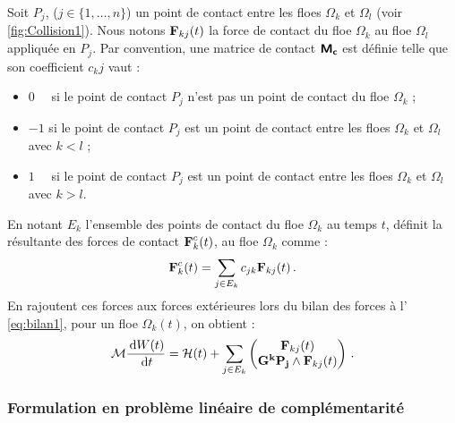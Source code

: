 Soit $P_j$, ($j \in \{1,\ldots,n\}$) un point de contact entre les floes $\Omega_k$ et $\Omega_l$ (voir \cref{fig:Collision1}). Nous notons $\bm{\mathrm{F}}_{kj}(t)$ la force de contact du floe $\Omega_k$ au floe $\Omega_l$ appliquée en $P_j$. Par convention, une matrice de contact $\bm{\mathsf{M_c}}$ est définie telle que son coefficient $c_kj$ vaut :
\begin{itemize}
    \item $0\,\,\,\,\,\, $ si le point de contact $P_j$ n’est pas un point de contact du floe $\Omega_k$ ;
    \item $-1$ si le point de contact $P_j$ est un point de contact entre les floes $\Omega_k$ et $\Omega_l$ avec $k < l$ ;
    \item $1\,\,\,\,\,\, $ si le point de contact $P_j$ est un point de contact entre les floes $\Omega_k$ et $\Omega_l$ avec $k > l$.
\end{itemize}
En notant $E_k$ l’ensemble des points de contact du floe $\Omega_k$ au temps $t$, \parencite[p.26]{rabatel2015thesis} définit la résultante des forces de contact $\bm{\mathrm{F}}^c_k(t)$, au floe $\Omega_k$ comme :
$$
\bm{\mathrm{F}}^c_k(t) = \sum_{j \in E_k} c_{jk} \bm{\mathrm{F}}_{kj}(t) \,.
$$
En rajoutent ces forces aux forces extérieures lors du bilan des forces à l' \cref{eq:bilan1}, pour un floe $\Omega_k(t)$, on obtient :
\begin{align} \label{eq:bilan1}
    \mathcal{M} \frac{\diff W(t)}{\diff t} = \mathcal{H}(t) + \sum_{j \in E_k} \begin{pmatrix}
        \bvec{F}_{kj}(t) \\ \bvec{G^kP_j} \wedge \bvec{F}_{kj}(t) 
    \end{pmatrix} \,.
\end{align}


\subsubsection{Formulation en problème linéaire de complémentarité}


